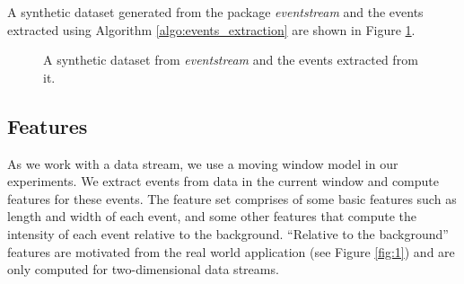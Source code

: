 \documentclass[11pt]{article}
\begin{document}
	 A synthetic dataset generated from the package {\it eventstream} and the events extracted using Algorithm \ref{algo:events_extraction} are shown in Figure \ref{fig:blobs_A_B}. 
	 
	 \begin{figure}[H]
	 	\centering
	 	\caption{\footnotesize A synthetic dataset from {\it eventstream} and the events extracted from it.} 
	 	\label{fig:blobs_A_B}
	 \end{figure}
	 
	 \subsection{Features}\label{sec:Featurelist}
	 As we work with a data stream, we use a moving window model in our experiments. We extract events from data in the current window and compute features for these events. The feature set comprises of some basic features such as length and width of each event, and some other features that compute the intensity of each event relative to the background. ``Relative to the background'' features  are motivated from the real world application (see Figure \ref{fig:1}) and are only computed for two-dimensional data streams.  
	 
\end{document}

